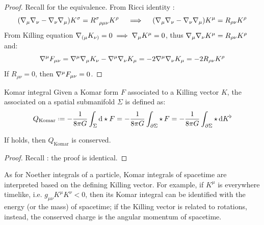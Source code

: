 \begin{proofbox}
  \begin{proof}
    Recall  for the equivalence. From Ricci identity :
    \begin{equation*}
      (\na_\mu \na_\nu - \na_\nu \na_\mu) K^\sigma = \tensor{R}{^\sigma_{\rho \mu \nu}} K^\rho
      \quad \implies \quad
      (\na_\mu \na_\nu - \na_\nu \na_\mu) K^\mu = R_{\rho \nu} K^\rho
    \end{equation*}
    From Killing equation $ \nabla_{(\mu} K_{\nu)} = 0 \implies \nabla_\mu K^\mu = 0 $, thus $ \nabla_\mu \nabla_\nu K^\mu = R_{\rho \nu} K^\rho $ and:
    \begin{equation*}
      \nabla^\mu F_{\mu \nu} = \nabla^\mu \nabla_\mu K_\nu - \nabla^\mu \nabla_\nu K_\mu = -2 \nabla^\mu \nabla_\nu K_\mu = -2 R_{\rho \nu} K^\rho
    \end{equation*}
    If $ R_{\rho \nu} = 0 $, then $ \nabla^\mu F_{\mu \nu} = 0 $.
  \end{proof}
\end{proofbox}

\begin{definition}{Komar integral}{}
  Given a Komar form $ F $ associated to a Killing vector $ K $, the associated  on a spatial submanifold $ \Sigma $ is defined as:
  \begin{equation}
    Q_{\text{Komar}} \defeq - \frac{1}{8\pi G} \int_\Sigma \dd \star F = - \frac{1}{8\pi G} \int_{\pa \Sigma} \star\, F = - \frac{1}{8\pi G} \int_{\pa \Sigma} \star\, \dd K^\flat
  \end{equation}
\end{definition}

\begin{proposition}{}{}
  If  holds, then $ Q_{\text{Komar}} $ is conserved.
\end{proposition}

\begin{proofbox}
  \begin{proof}
    Recall : the proof is identical.
  \end{proof}
\end{proofbox}

As for Noether integrals of a particle, Komar integrals of spacetime are interpreted based on the defining Killing vector. For example, if $ K^\mu $ is everywhere timelike, i.e. $ g_{\mu \nu} K^\mu K^\nu < 0 $, then its Komar integral can be identified with the energy (or the mass) of spacetime; if the Killing vector is related to rotations, instead, the conserved charge is the angular momentum of spacetime.

